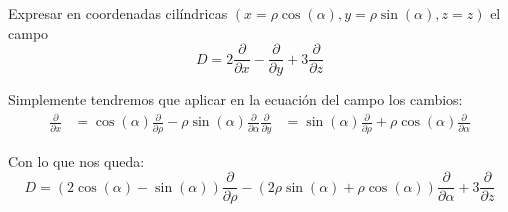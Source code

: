 \begin{problem}[7]
Expresar en coordenadas cilíndricas $(x=ρ\cos(α), y=ρ\sin(α), z=z)$ el campo
\[D= 2 \frac{\partial}{\partial x}-\frac{\partial}{\partial y}+3\frac{\partial}{\partial z}\]

\solution
\yoP

Simplemente tendremos que aplicar en la ecuación del campo los cambios:
\begin{align}
\frac{\partial}{\partial x} &= \cos(α)\frac{\partial}{\partial ρ}-ρ\sin(α)\frac{\partial}{\partial α}
\frac{\partial}{\partial y} &= \sin(α)\frac{\partial}{\partial ρ}+ρ\cos(α)\frac{\partial}{\partial α}
\end{align}

Con lo que nos queda:
\[D=(2\cos(α)-\sin(α))\frac{\partial}{\partial ρ}-(2ρ\sin(α)+ρ\cos(α))\frac{\partial}{\partial α}+3\frac{\partial}{\partial z}\]

\end{problem}

